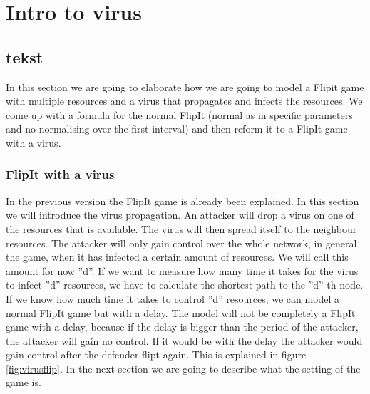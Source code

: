 \chapter{Intro to virus}
\label{cha:6}



\section{tekst}

In this section we are going to elaborate how we are going to model a Flipit game with multiple resources and a virus that propagates and infects the resources. We come up with a formula for the normal FlipIt (normal as in specific parameters and no normalising over the first interval) and then reform it to a FlipIt game with a virus. 

\subsection{FlipIt with a virus}
In the previous version the FlipIt game is already been explained. In this section we will introduce the virus propagation. An attacker will drop a virus on one of the resources that is available. The virus will then spread itself to the neighbour resources. The attacker will only gain control over the whole network, in general the game, when it has infected a certain amount of resources. We will call this amount for now ''d''. If we want to measure how many time it takes for the virus to infect ''d'' resources, we have to calculate the shortest path to the ''d'' th node.  If we know how much time it takes to control ''d'' resources, we can model a normal FlipIt game but with a delay. The model will not be completely a FlipIt game with a delay, because if the delay is bigger than the period of the attacker, the attacker will gain no control. If it would be with the delay the attacker would gain control after the defender flipt again. This is explained in figure \ref{fig:virusflip}.  In the next section we are going to describe what the setting of the game is.

